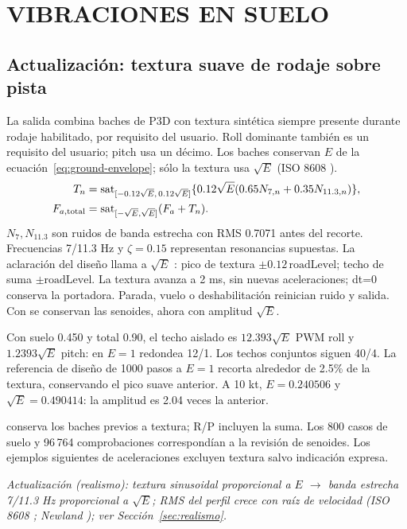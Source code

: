 \section{VIBRACIONES EN SUELO}
\label{sec:suelo}

\subsection{Actualización: textura suave de rodaje sobre pista}
La salida combina baches de P3D con textura sintética siempre presente durante rodaje habilitado, por requisito del usuario. Roll dominante también es un requisito del usuario; pitch usa un décimo. Los baches conservan $E$ de la ecuación~\ref{eq:ground-envelope}; sólo la textura usa $\sqrt E$ (ISO 8608 \cite{iso8608}).
\begin{align*}
T_n&=\operatorname{sat}_{[-0.12\sqrt E,\,0.12\sqrt E]}\{0.12\sqrt E(0.65N_{7,n}+0.35N_{11.3,n})\},\\
F_{a,\mathrm{total}}&=\operatorname{sat}_{[-\sqrt E,\sqrt E]}(F_a+T_n).
\end{align*}
$N_7,N_{11.3}$ son ruidos de banda estrecha con RMS 0.7071 antes del recorte. Frecuencias 7/11.3 Hz y $\zeta=0.15$ representan resonancias supuestas. La aclaración del diseño llama a $\sqrt E$ : pico de textura $\pm0.12\,\mathrm{roadLevel}$; techo de suma $\pm\mathrm{roadLevel}$. La textura avanza a 2 ms, sin nuevas aceleraciones; dt=0 conserva la portadora. Parada, vuelo o deshabilitación reinician ruido y salida. Con  se conservan las senoides, ahora con amplitud $\sqrt E$.

Con suelo 0.450 y total 0.90, el techo aislado es $12.393\sqrt E$ PWM roll y $1.2393\sqrt E$ pitch: en $E=1$ redondea 12/1. Los techos conjuntos siguen 40/4. La referencia de diseño de 1000 pasos a $E=1$ recorta alrededor de 2.5\% de la textura, conservando el pico suave anterior. A 10 kt, $E=0.240506$ y $\sqrt E=0.490414$: la amplitud es 2.04 veces la anterior.

 conserva los baches previos a textura; R/P incluyen la suma. Los 800 casos de suelo y 96\,764 comprobaciones correspondían a la revisión de senoides. Los ejemplos siguientes de aceleraciones excluyen textura salvo indicación expresa.

\textit{Actualización (realismo): textura sinusoidal proporcional a $E$ $\rightarrow$ banda estrecha 7/11.3 Hz proporcional a $\sqrt E$; RMS del perfil crece con raíz de velocidad (ISO 8608 \cite{iso8608}; Newland \cite{newland1993}); ver Sección~\ref{sec:realismo}.}

